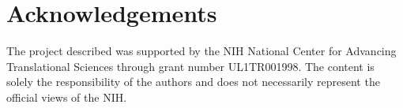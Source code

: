 \documentclass[onecolumn, compsoc,11pt]{IEEEtran}
\begin{document}




\section*{Acknowledgements}
The project described was supported by the NIH National Center for Advancing Translational Sciences through grant number UL1TR001998.  The content is solely the responsibility of the authors and does not necessarily represent the official views of the NIH.
\end{document}

